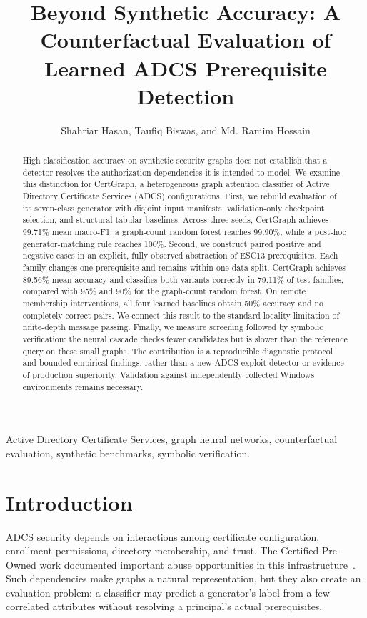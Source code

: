 \documentclass[journal]{IEEEtran}
\begin{document}
\title{Beyond Synthetic Accuracy: A Counterfactual Evaluation of Learned ADCS Prerequisite Detection}
\author{Shahriar Hasan, Taufiq Biswas, and Md. Ramim Hossain}
\maketitle
\begin{abstract}
High classification accuracy on synthetic security graphs does not establish that a detector resolves the authorization dependencies it is intended to model. We examine this distinction for CertGraph, a heterogeneous graph attention classifier of Active Directory Certificate Services (ADCS) configurations. First, we rebuild evaluation of its seven-class generator with disjoint input manifests, validation-only checkpoint selection, and structural tabular baselines. Across three seeds, CertGraph achieves 99.71\% mean macro-F1; a graph-count random forest reaches 99.90\%, while a post-hoc generator-matching rule reaches 100\%. Second, we construct paired positive and negative cases in an explicit, fully observed abstraction of ESC13 prerequisites. Each family changes one prerequisite and remains within one data split. CertGraph achieves 89.56\% mean accuracy and classifies both variants correctly in 79.11\% of test families, compared with 95\% and 90\% for the graph-count random forest. On remote membership interventions, all four learned baselines obtain 50\% accuracy and no completely correct pairs. We connect this result to the standard locality limitation of finite-depth message passing. Finally, we measure screening followed by symbolic verification: the neural cascade checks fewer candidates but is slower than the reference query on these small graphs. The contribution is a reproducible diagnostic protocol and bounded empirical findings, rather than a new ADCS exploit detector or evidence of production superiority. Validation against independently collected Windows environments remains necessary.
\end{abstract}
\begin{IEEEkeywords}
Active Directory Certificate Services, graph neural networks, counterfactual evaluation, synthetic benchmarks, symbolic verification.
\end{IEEEkeywords}

\section{Introduction}
ADCS security depends on interactions among certificate configuration, enrollment permissions, directory membership, and trust. The Certified Pre-Owned work documented important abuse opportunities in this infrastructure~\cite{certified}. Such dependencies make graphs a natural representation, but they also create an evaluation problem: a classifier may predict a generator's label from a few correlated attributes without resolving a principal's actual prerequisites.
\end{document}
